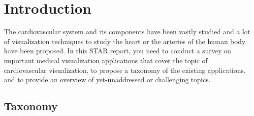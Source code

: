 \section{Introduction}

The cardiovascular system and its components have been vastly studied and a lot 
of visualization techniques to study the heart or the arteries of the human body 
have  been  proposed.  In  this  STAR  report,  you  need  to  conduct  a  survey  on 
important  medical  visualization  applications  that  cover  the  topic  of 
cardiovascular visualization, to propose a taxonomy of the existing applications, 
and to provide an overview of yet-unaddressed or challenging topics.  

\subsection{Taxonomy}
